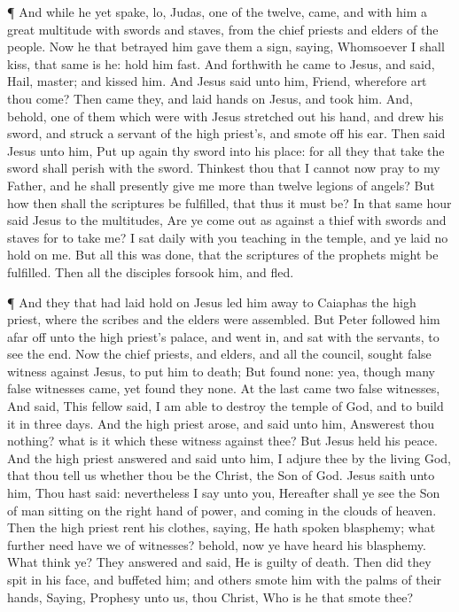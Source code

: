  ¶ And while he yet spake, lo, Judas, one of the twelve,
came, and with him a great multitude with swords and staves, from the
chief priests and elders of the people.  Now he that
betrayed him gave them a sign, saying, Whomsoever I shall kiss, that
same is he: hold him fast.  And forthwith he came to Jesus,
and said, Hail, master; and kissed him.  And Jesus said
unto him, Friend, wherefore art thou come? Then came they, and laid
hands on Jesus, and took him.  And, behold, one of them
which were with Jesus stretched out his hand, and drew his sword, and
struck a servant of the high priest's, and smote off his ear.
 Then said Jesus unto him, Put up again thy sword into his
place: for all they that take the sword shall perish with the sword.
 Thinkest thou that I cannot now pray to my Father, and he
shall presently give me more than twelve legions of angels?
 But how then shall the scriptures be fulfilled, that thus
it must be?  In that same hour said Jesus to the
multitudes, Are ye come out as against a thief with swords and staves
for to take me? I sat daily with you teaching in the temple, and ye laid
no hold on me.  But all this was done, that the scriptures
of the prophets might be fulfilled. Then all the disciples forsook him,
and fled.

 ¶ And they that had laid hold on Jesus led him away to
Caiaphas the high priest, where the scribes and the elders were
assembled.  But Peter followed him afar off unto the high
priest's palace, and went in, and sat with the servants, to see the end.
 Now the chief priests, and elders, and all the council,
sought false witness against Jesus, to put him to death; 
But found none: yea, though many false witnesses came, yet found they
none. At the last came two false witnesses,  And said, This
fellow said, I am able to destroy the temple of God, and to build it in
three days.  And the high priest arose, and said unto him,
Answerest thou nothing? what is it which these witness against thee?
 But Jesus held his peace. And the high priest answered and
said unto him, I adjure thee by the living God, that thou tell us
whether thou be the Christ, the Son of God.  Jesus saith
unto him, Thou hast said: nevertheless I say unto you, Hereafter shall
ye see the Son of man sitting on the right hand of power, and coming in
the clouds of heaven.  Then the high priest rent his
clothes, saying, He hath spoken blasphemy; what further need have we of
witnesses? behold, now ye have heard his blasphemy.  What
think ye? They answered and said, He is guilty of death. 
Then did they spit in his face, and buffeted him; and others smote him
with the palms of their hands,  Saying, Prophesy unto us,
thou Christ, Who is he that smote thee?

